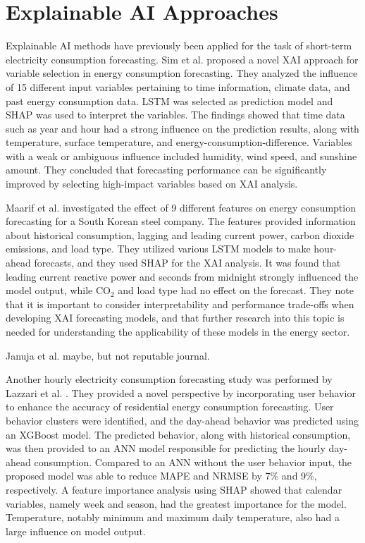\section{Explainable AI Approaches}

Explainable AI methods have previously been applied for the task of short-term electricity consumption forecasting. Sim et al. \cite{sim_explainable_2022} proposed a novel XAI approach for variable selection in energy consumption forecasting. They analyzed the influence of 15 different input variables pertaining to time information, climate data, and past energy consumption data. LSTM was selected as prediction model and SHAP was used to interpret the variables. The findings showed that time data such as year and hour had a strong influence on the prediction results, along with temperature, surface temperature, and energy\hyp{}consumption\hyp{}difference. Variables with a weak or ambiguous influence included humidity, wind speed, and sunshine amount. They concluded that forecasting performance can be significantly improved by selecting high-impact variables based on XAI analysis.

Maarif et al. \cite{maarif_energy_2023} investigated the effect of 9 different features on energy consumption forecasting for a South Korean steel company. The features provided information about historical consumption, lagging and leading current power, carbon dioxide emissions, and load type. They utilized various LSTM models to make hour-ahead forecasts, and they used SHAP for the XAI analysis. It was found that leading current reactive power and seconds from midnight strongly influenced the model output, while CO$_2$ and load type had no effect on the forecast. They note that it is important to consider interpretability and performance trade-offs when developing XAI forecasting models, and that further research into this topic is needed for understanding the applicability of these models in the energy sector.

Januja et al. \cite{janjua_enhancing_2024} maybe, but not reputable journal.

Another hourly electricity consumption forecasting study was performed by Lazzari et al. \cite{lazzari_user_2022}. They provided a novel perspective by incorporating user behavior to enhance the accuracy of residential energy consumption forecasting. User behavior clusters were identified, and the day-ahead behavior was predicted using an XGBoost model. The predicted behavior, along with historical consumption, was then provided to an ANN model responsible for predicting the hourly day-ahead consumption. Compared to an ANN without the user behavior input, the proposed model was able to reduce MAPE and NRMSE by 7\% and 9\%, respectively. A feature importance analysis using SHAP showed that calendar variables, namely week and season, had the greatest importance for the model. Temperature, notably minimum and maximum daily temperature, also had a large influence on model output.

